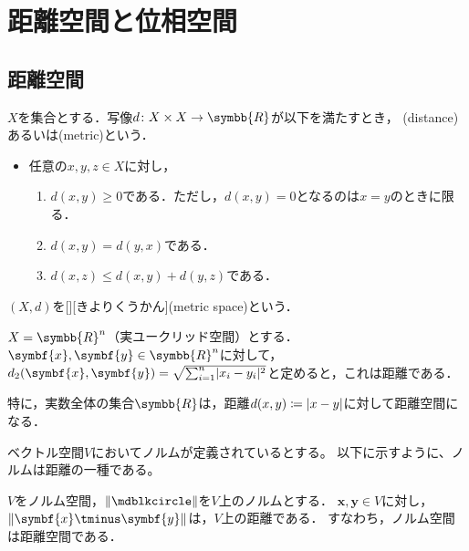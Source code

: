 \documentclass[../sotsu.tex]{subfiles}
\begin{document}
\section{距離空間と位相空間}

\subsection{距離空間}

\begin{definition}[距離]
    \label{dfn:distance}
    $X$を集合とする．写像$d \colon X \times X \to \symbb{R}$が以下を満たすとき，
    (distance)あるいは(metric)という．
    \begin{itemize}
        \item 任意の$x, y, z \in X$に対し，
        \begin{enumerate}
            \item \label{dist:positivity} $d(x, y) \geq 0$である．ただし，$d(x, y) = 0$となるのは$x = y$のときに限る．
            \item \label{dist:symmetry} $d(x, y) = d(y, x)$である．
            \item \label{dist:triangle-inequality}$d(x, z) \leq d(x, y) + d(y, z)$である．
        \end{enumerate}
    \end{itemize}
    $(X, d)$を[][きよりくうかん](metric space)という．
\end{definition}


\begin{example}
    $X = \symbb{R}^n$（実ユークリッド空間）とする．
    $\symbf{x}, \symbf{y} \in \symbb{R}^n$に対して，
    $d_2 (\symbf{x}, \symbf{y}) = \sqrt{ \sum_{i = 1}^{n} \abs{x_i - y_i}^2 }$と定めると，これは距離である．

    特に，実数全体の集合$\symbb{R}$は，距離$d(x, y) \coloneq \lvert x - y\rvert$に対して距離空間になる．
\end{example}

ベクトル空間$V$においてノルムが定義されているとする。
以下に示すように、ノルムは距離の一種である。

\begin{proposition}
    \label{thm:norm-is-distance}
    $V$をノルム空間，$\norm{\bigdot}$を$V$上のノルムとする．
    $\symbf{x}, \symbf{y} \in V$に対し，$\norm{\symbf{x} \tminus \symbf{y}}$は，$V$上の距離である．
    すなわち，ノルム空間は距離空間である．
\end{proposition}
\end{document}

